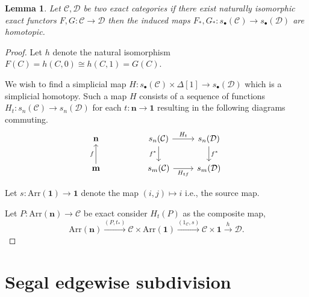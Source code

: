 \documentclass[12pt]{report}
\numberwithin{equation}{section}
\newtheorem{lemma}[dummy]{Lemma}
\begin{document}
	\begin{lemma}
		Let \( \mathcal{C, D} \) be two exact categories if there exist naturally isomorphic exact functors \( F,G: \mathcal{C} \to \mathcal{D} \) then the induced maps \( F_*,G_*: s_\bullet(\mathcal{C}) \to s_\bullet(\mathcal{D})\) are homotopic.
	\end{lemma}
	\begin{proof}
		Let \( h \) denote the natural isomorphism \( F(C)=h(C,0)\cong h(C,1)=G(C) \).
		
		We wish to find a simplicial map \( H: s_\bullet(\mathcal{C}) \times \Delta[1] \to s_\bullet(\mathcal{D})\) which is a simplicial homotopy. Such a map \( H \) consists of a sequence of functions \( H_t: s_n(\mathcal{C}) \to s_n(\mathcal{D}) \) for each \( t: \mathbf{n} \to \mathbf{1} \) resulting in the following diagrams commuting.
		\[\begin{tikzcd}
			\mathbf{n} && {s_n(\mathcal{C})} & {s_n(\mathcal{D})} \\
			\mathbf{m} && {s_m(\mathcal{C})} & {s_m(\mathcal{D})}
			\arrow["{H_t}", from=1-3, to=1-4]
			\arrow["{f^*}"', from=1-3, to=2-3]
			\arrow["{f^*}", from=1-4, to=2-4]
			\arrow["f", from=2-1, to=1-1]
			\arrow["{H_{tf}}"', from=2-3, to=2-4]
		\end{tikzcd}\]
		
		Let \( s:\mathrm{Arr}(\mathbf{1})  \to \mathbf{1} \) denote the map \( (i,j)\mapsto i \) i.e., the source map.
		
		Let \( P:\mathrm{Arr}(\mathbf{n}) \to \mathcal{C} \) be exact consider \( H_t(P) \) as the composite map, \[ \mathrm{Arr}(\mathbf{n}) \xrightarrow{(P,t_*)} \mathcal{C} \times \mathrm{Arr}(\mathbf{1}) \xrightarrow{(1_\mathcal{C},s)} \mathcal{C}\times \mathbf{1} \xrightarrow{h} \mathcal{D}.\]
	\end{proof}
	
	\section{Segal edgewise subdivision}
	
\end{document}
